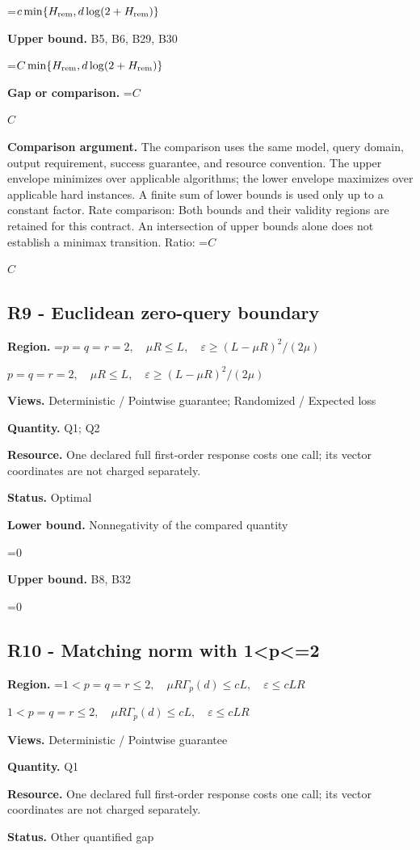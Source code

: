 \documentclass[10pt,a4paper]{article}
\newcommand{\AtlasMath}[1]{\par\begingroup\centering\setbox0=\hbox{$\displaystyle #1$}\ifdim\wd0>1.4\linewidth\typeout{ATLAS WIDE FORMULA: \the\wd0}\fi\ifdim\wd0>\linewidth\resizebox{\linewidth}{!}{\box0}\else\box0\fi\par\endgroup}
\newcommand{\AtlasInlineMath}[1]{\begingroup\setbox0=\hbox{$#1$}\ifdim\wd0>.4\linewidth\endgroup\AtlasMath{#1}\else\endgroup$#1$\fi}
\begin{document}
\AtlasMath{c\min\{H_{\rm rem},d\log(2+H_{\rm rem})\}}
\textbf{Upper bound.} B5, B6, B29, B30

\AtlasMath{C\min\{H_{\rm rem},d\log(2+H_{\rm rem})\}}
\textbf{Gap or comparison.} \AtlasInlineMath{C}

\textbf{Comparison argument.} The comparison uses the same model, query domain, output requirement, success guarantee, and resource convention. The upper envelope minimizes over applicable algorithms; the lower envelope maximizes over applicable hard instances. A finite sum of lower bounds is used only up to a constant factor. Rate comparison: Both bounds and their validity regions are retained for this contract. An intersection of upper bounds alone does not establish a minimax transition. Ratio: \AtlasInlineMath{C}

\subsection{R9 - Euclidean zero-query boundary}
\textbf{Region.} \AtlasInlineMath{p=q=r=2,\quad\mu R\le L,\quad\varepsilon\ge(L-\mu R)^2/(2\mu)}

\textbf{Views.} Deterministic / Pointwise guarantee; Randomized / Expected loss

\textbf{Quantity.} Q1; Q2

\textbf{Resource.} One declared full first-order response costs one call; its vector coordinates are not charged separately.

\textbf{Status.} Optimal

\textbf{Lower bound.} Nonnegativity of the compared quantity

\AtlasMath{0}
\textbf{Upper bound.} B8, B32

\AtlasMath{0}
\subsection{R10 - Matching norm with 1<p<=2}
\textbf{Region.} \AtlasInlineMath{1<p=q=r\le2,\quad\mu R\Gamma_p(d)\le cL,\quad\varepsilon\le cLR}

\textbf{Views.} Deterministic / Pointwise guarantee

\textbf{Quantity.} Q1

\textbf{Resource.} One declared full first-order response costs one call; its vector coordinates are not charged separately.

\textbf{Status.} Other quantified gap
\end{document}
